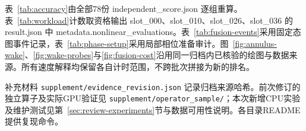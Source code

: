表~\ref{tab:accuracy}由全部78份 independent\_score.json 逐组重算。表~\ref{tab:workload}计数取资格输出 slot\_000、slot\_010、slot\_026、slot\_036 的 result.json 中 metadata.nonlinear\_evaluations。表~\ref{tab:fusion-events}采用固定态图事件记录，表~\ref{tab:phase-setup}采用局部相位准备审计。图~\ref{fig:annulus-wake}、\ref{fig:wake-probes}与\ref{fig:fusion-cost}沿用同一归档内已核验的绘图与数据来源。所有速度解释均保留各自计时范围，不跨批次拼接为新的排名。

补充材料 \nolinkurl{supplement/evidence_revision.json} 记录归档来源哈希。前次修订的独立算子及实际GPU验证见 \nolinkurl{supplement/operator_sample/}；本次新增CPU实验及维护测试见第~\ref{sec:review-experiments}节与数据可用性说明。各目录README提供复现命令。

